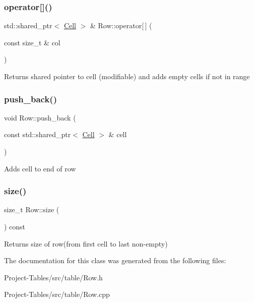 \subsubsection{\texorpdfstring{operator[]()}{operator[]()}\hspace{0.1cm}{\footnotesize\ttfamily [2/2]}}
{\footnotesize\ttfamily std\+::shared\+\_\+ptr$<$ \hyperlink{classCell}{Cell} $>$ \& Row\+::operator\mbox{[}$\,$\mbox{]} (\begin{DoxyParamCaption}\item[{const size\+\_\+t \&}]{col }\end{DoxyParamCaption})}

Returns shared pointer to cell (modifiable) and adds empty cells if not in range \mbox{\label{classRow_a8b22fb69f506e4d7d5c283b5260a1462}} 
\subsubsection{\texorpdfstring{push\+\_\+back()}{push\_back()}}
{\footnotesize\ttfamily void Row\+::push\+\_\+back (\begin{DoxyParamCaption}\item[{const std\+::shared\+\_\+ptr$<$ \hyperlink{classCell}{Cell} $>$ \&}]{cell }\end{DoxyParamCaption})}

Adds cell to end of row \mbox{\label{classRow_a17898a404936d1af41aebee87d5bce7a}} 
\subsubsection{\texorpdfstring{size()}{size()}}
{\footnotesize\ttfamily size\+\_\+t Row\+::size (\begin{DoxyParamCaption}{ }\end{DoxyParamCaption}) const}

Returns size of row(from first cell to last non-\/empty) 

The documentation for this class was generated from the following files\+:\begin{DoxyCompactItemize}
\item 
Project-\/\+Tables/src/table/Row.\+h\item 
Project-\/\+Tables/src/table/Row.\+cpp\end{DoxyCompactItemize}
